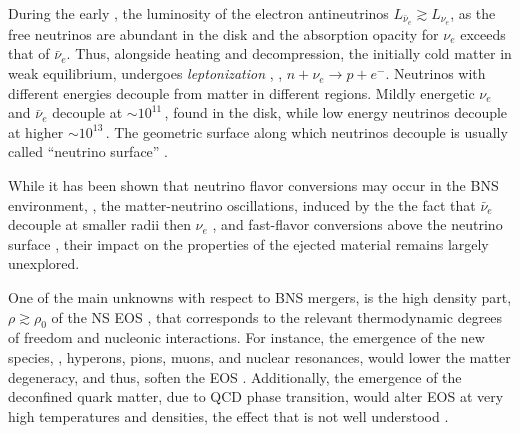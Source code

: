 During the early \pmerg{}, the luminosity of the electron antineutrinos 
$L_{\bar{\nu}_e} \gtrsim L_{\nu_e}$, as the 
free neutrinos are abundant in the disk and the absorption opacity for $\nu_e$ 
exceeds that of $\bar{\nu}_e$.
Thus, alongside heating and decompression, the initially cold matter in weak 
equilibrium, undergoes \textit{leptonization} 
\citep{Perego:2014fma,Endrizzi:2019trv},
\ie, $n+\nu_e\rightarrow p + e^-$. %
%
Neutrinos with different energies decouple from matter in different regions.
Mildly energetic $\nu_{e}$ and $\bar{\nu}_e$ decouple at ${\sim}10^{11}\,$\gcm, found 
in the disk, while low energy neutrinos decouple at higher ${\sim}10^{13}\,$\gcm.
The geometric surface along which neutrinos decouple is usually called ``neutrino 
surface'' \citep{Perego:2014fma,Endrizzi:2019trv}.

While it has been shown that neutrino flavor conversions may occur in the \ac{BNS} 
\pmerg{} environment, \eg, the matter-neutrino oscillations, induced by the 
the fact that $\bar{\nu}_e$ decouple at smaller radii then $\nu_{e}$ 
\citep[\eg][]{Zhu:2016mwa,Tian:2017xbr}, and fast-flavor conversions above the 
neutrino surface \citep{Wu:2017drk}, their impact on the properties of the ejected 
material remains largely unexplored.

One of the main unknowns with respect to \ac{BNS} mergers, is the high density part, 
$\rho \gtrsim \rho_0$ of the \ac{NS} \ac{EOS} \citep[\eg][]{Hebeler:2013nza,Oertel:2016bki}, that corresponds to the 
relevant thermodynamic degrees of freedom and nucleonic interactions. For instance, 
the emergence of the new species, \eg, hyperons, pions, muons, and nuclear 
resonances, would lower the matter degeneracy, and thus, soften the \ac{EOS} \citep[\eg][]{Fore:2019wib,Vidana:2010ip}.
Additionally, the emergence of the deconfined quark matter, due to \ac{QCD} phase transition,
would alter \ac{EOS} at very high temperatures and densities,
the effect that is not well understood \citep{Busza:2018rrf}.


